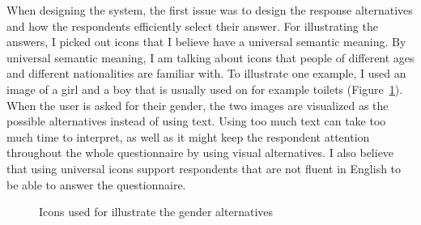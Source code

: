   When designing the system, the first issue was to design the response alternatives and how the respondents efficiently select their answer. For illustrating the answers, I picked out icons that I believe have a universal semantic meaning. By universal semantic meaning, I am talking about icons that people of different ages and different nationalities are familiar with. To illustrate one example, I used an image of a girl and a boy that is usually used on for example toilets (Figure~\ref{fig:boygirl}). When the user is asked for their gender, the two images are visualized as the possible alternatives instead of using text. Using too much text can take too much time to interpret, as well as it might keep the respondent attention throughout the whole questionnaire by using visual alternatives. I also believe that using universal icons support respondents that are not fluent in English to be able to answer the questionnaire.

  \begin{figure}[H]
    \centering
    \caption{Icons used for illustrate the gender alternatives}
    \label{fig:boygirl}
  \end{figure}


